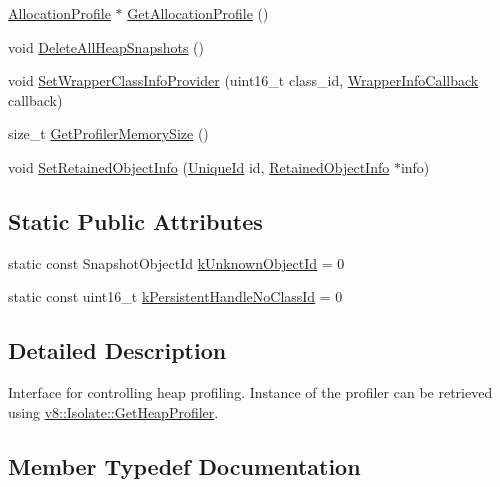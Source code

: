 \begin{DoxyCompactItemize}
\item 
\hyperlink{classv8_1_1AllocationProfile}{Allocation\+Profile} $\ast$ \hyperlink{classv8_1_1HeapProfiler_aaadb22168da6a2889796ed3b5638cd50}{Get\+Allocation\+Profile} ()
\item 
void \hyperlink{classv8_1_1HeapProfiler_a6a75bcc6d8350858597b6a6ce5e349a2}{Delete\+All\+Heap\+Snapshots} ()
\item 
void \hyperlink{classv8_1_1HeapProfiler_a7744cf111ad9c6b0b409841f8ed8bcdd}{Set\+Wrapper\+Class\+Info\+Provider} (uint16\+\_\+t class\+\_\+id, \hyperlink{classv8_1_1HeapProfiler_a677025dd201fd832e0464e5ab0b0d0d4}{Wrapper\+Info\+Callback} callback)
\item 
size\+\_\+t \hyperlink{classv8_1_1HeapProfiler_a76435e93466db7519fb31417ea39b13e}{Get\+Profiler\+Memory\+Size} ()
\item 
void \hyperlink{classv8_1_1HeapProfiler_a70821ff8e1c2cc92c310c5c4f1fa5ec7}{Set\+Retained\+Object\+Info} (\hyperlink{classv8_1_1UniqueId}{Unique\+Id} id, \hyperlink{classv8_1_1RetainedObjectInfo}{Retained\+Object\+Info} $\ast$info)
\end{DoxyCompactItemize}
\subsection*{Static Public Attributes}
\begin{DoxyCompactItemize}
\item 
static const Snapshot\+Object\+Id \hyperlink{classv8_1_1HeapProfiler_abf2b9d8facb18473f9b124ab8baf5786}{k\+Unknown\+Object\+Id} = 0
\item 
static const uint16\+\_\+t \hyperlink{classv8_1_1HeapProfiler_a272c9af3ea5cd90a2737af3d22a7eb78}{k\+Persistent\+Handle\+No\+Class\+Id} = 0
\end{DoxyCompactItemize}


\subsection{Detailed Description}
Interface for controlling heap profiling. Instance of the profiler can be retrieved using \hyperlink{classv8_1_1Isolate_a9c48259615e8370f6f0efd27cd7f99a6}{v8\+::\+Isolate\+::\+Get\+Heap\+Profiler}. 

\subsection{Member Typedef Documentation}
